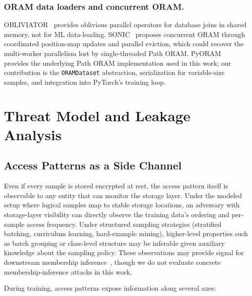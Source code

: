\documentclass{llncs}
\begin{document}
\subsubsection{ORAM data loaders and concurrent ORAM.}
OBLIVIATOR~\cite{mavrogiannakis2025} provides oblivious parallel operators for database joins in shared memory, not for ML data-loading.
SONIC~\cite{talur2026} proposes concurrent ORAM through coordinated position-map updates and parallel eviction, which could recover the multi-worker parallelism lost by single-threaded Path ORAM.
PyORAM~\cite{pyoram} provides the underlying Path ORAM implementation used in this work; our contribution is the \texttt{ORAMDataset} abstraction, serialization for variable-size samples, and integration into PyTorch's training loop.

\section{Threat Model and Leakage Analysis}
\label{sec:threat}

\subsection{Access Patterns as a Side Channel}

Even if every sample is stored encrypted at rest, the access pattern itself is observable to any entity that can monitor the storage layer.
Under the modeled setup where logical samples map to stable storage locations, an adversary with storage-layer visibility can directly observe the training data's ordering and per-sample access frequency.
Under structured sampling strategies (stratified batching, curriculum learning, hard-example mining), higher-level properties such as batch grouping or class-level structure may be inferable given auxiliary knowledge about the sampling policy.
These observations may provide signal for downstream membership inference~\cite{shokri2017}, though we do not evaluate concrete membership-inference attacks in this work.

During training, access patterns expose information along several axes:
\end{document}
